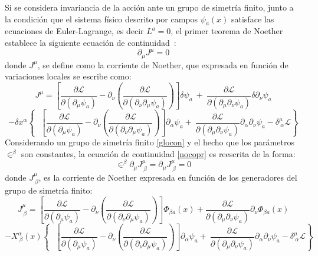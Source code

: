 \documentclass[a4paper,12pt]{article}
\begin{document}
Si se considera invariancia de la acción ante un grupo de simetría finito, junto a la condición que el sistema físico descrito por campos $\psi_a(x)$ satisface las ecuaciones de \mbox{Euler-Lagrange,} es decir \mbox{$L^a=0$}, el primer teorema de Noether establece la siguiente ecuación de \mbox{continuidad \cite{noether,general,greiner}:}
\begin{equation}
\partial_\mu J^\mu=0 
\label{nocopr}
\end{equation}
donde $J^\mu$, se define como la corriente de Noether, que expresada en función de variaciones locales se escribe como: 
\begin{equation}
J^\mu=\left[\frac{\partial \mathscr{L} }{\partial(\partial_{\mu} \psi_a)}-\partial_{\nu}\left(\frac{\partial\mathscr{L} }{\partial(\partial_{\nu}\partial_{\mu} \psi_a)}  \right) \right]\delta\psi_a\ +\ \frac{\partial\mathscr{L} }{\partial(\partial_{\mu}\partial_{\nu} \psi_a)}\delta\partial_\nu\psi_a
\label{corrino}
\end{equation}
$$ -\delta x^\alpha\left\{\ \ \ \left[\frac{\partial \mathscr{L} }{\partial(\partial_{\mu} \psi_a)}-\partial_{\nu}\left(\frac{\partial\mathscr{L} }{\partial(\partial_{\nu}\partial_{\mu} \psi_a)}  \right) \right]\partial_\alpha\psi_a +\ \frac{\partial\mathscr{L} }{\partial(\partial_{\mu}\partial_{\nu} \psi_a)}\partial_\alpha\partial_\nu\psi_a-\delta^\mu_{\ \alpha}\mathscr{L}   \right\}$$
Considerando un grupo de simetría finito \eqref{glocon} y el hecho que los parámetros $\in^\beta$ son constantes, la ecuación de continuidad \eqref{nocopr} es reescrita de la forma:
\begin{equation}
\in^\beta\partial_\mu J^\mu_{\ \beta}=\partial_\mu J^\mu_{\ \beta}=0 
\label{congene}
\end{equation}
donde $J^\mu_{\ \beta}$, es la corriente de Noether expresada en función de los generadores del grupo de simetría finito:
\begin{equation}
J^\mu_{\ \beta}=\left[\frac{\partial \mathscr{L} }{\partial(\partial_{\mu} \psi_a)}-\partial_{\nu}\left(\frac{\partial\mathscr{L} }{\partial(\partial_{\nu}\partial_{\mu} \psi_a)}  \right) \right]\Phi_{\beta a}(x)+\frac{\partial\mathscr{L} }{\partial(\partial_{\mu}\partial_{\nu} \psi_a)}\partial_\nu\Phi_{\beta a}(x)
\label{corrinoss}
\end{equation}
$$ -X_{\ \beta}^\alpha(x)\left\{\ \ \ \left[\frac{\partial \mathscr{L} }{\partial(\partial_{\mu} \psi_a)}-\partial_{\nu}\left(\frac{\partial\mathscr{L} }{\partial(\partial_{\nu}\partial_{\mu} \psi_a)}  \right) \right]\partial_\alpha\psi_a +\ \frac{\partial\mathscr{L} }{\partial(\partial_{\mu}\partial_{\nu} \psi_a)}\partial_\alpha\partial_\nu\psi_a-\delta^\mu_{\ \alpha}\mathscr{L}   \right\}$$
\\
\end{document}
